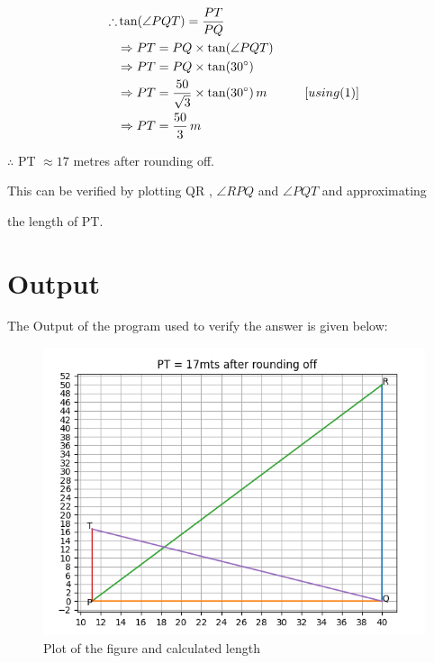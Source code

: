 \documentclass{article}
\begin{document}
\begin{align*}
\therefore &\tan(\angle PQT) = \frac{PT}{PQ} \\
&\Rightarrow PT = PQ \times \tan(\angle PQT)\\
&\Rightarrow PT = PQ \times \tan(30 \degree)\\
&\Rightarrow PT = \frac{50}{\sqrt{3}} \times \tan(30 \degree) \, m \hspace{30pt}[using (1)]\\
&\Rightarrow PT = \frac{50}{3}\, m
\end{align*}

\noindent $\therefore$ PT  $ \approx 17 $ metres after rounding off.

\vspace{2pt}
\noindent This can be verified by plotting QR , $\angle RPQ$ and $\angle PQT$ and approximating 

\noindent the length of PT.\pagebreak
\section*{Output}
\noindent The Output of the program used to verify the answer is given below:
\begin{figure}[h]
\includegraphics[width=\textwidth]{output.png}
\caption{Plot of the figure and calculated length}
\end{figure}
\end{document}

